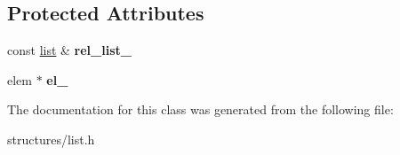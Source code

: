 \subsection*{Protected Attributes}
\begin{DoxyCompactItemize}
\item 
\mbox{\label{classmystl_1_1list_1_1const__iterator_ae49a8698edf2bb65d2c89dd8b8a10acb}} 
const \hyperlink{classmystl_1_1list}{list} \& {\bfseries rel\+\_\+list\+\_\+}
\item 
\mbox{\label{classmystl_1_1list_1_1const__iterator_a9a24a4d9be8241a70547b2d3365531f3}} 
elem $\ast$ {\bfseries el\+\_\+}
\end{DoxyCompactItemize}


The documentation for this class was generated from the following file\+:\begin{DoxyCompactItemize}
\item 
structures/list.\+h\end{DoxyCompactItemize}
